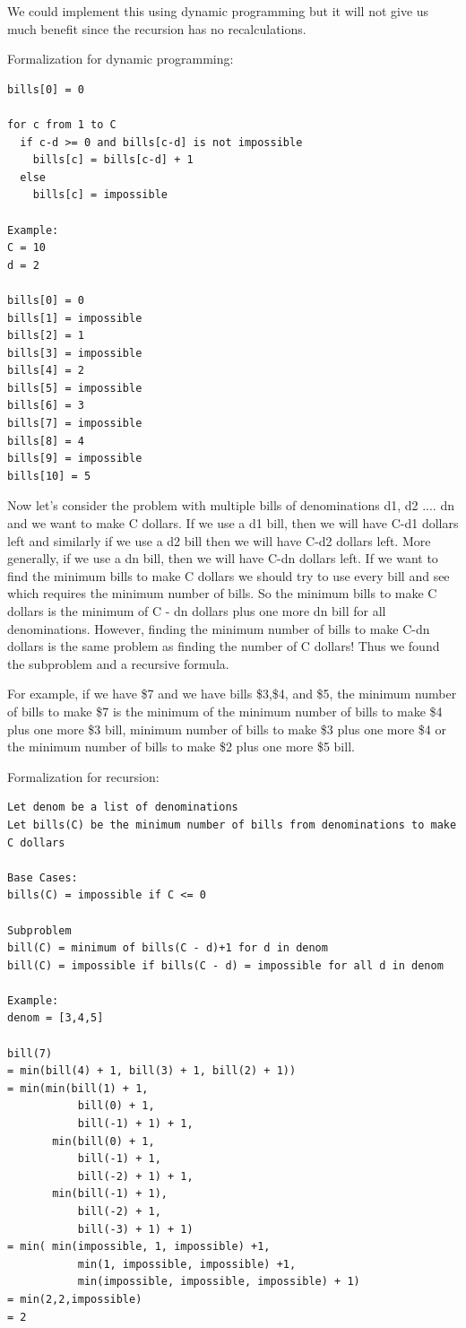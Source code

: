 \documentclass[11pt,oneside]{book}
\begin{document}
We could implement this using dynamic programming but it will not give us much benefit since the recursion has no recalculations.

Formalization for dynamic programming:

\begin{lstlisting}
bills[0] = 0

for c from 1 to C
  if c-d >= 0 and bills[c-d] is not impossible
    bills[c] = bills[c-d] + 1
  else
    bills[c] = impossible

Example:
C = 10
d = 2

bills[0] = 0
bills[1] = impossible
bills[2] = 1
bills[3] = impossible
bills[4] = 2
bills[5] = impossible
bills[6] = 3
bills[7] = impossible
bills[8] = 4
bills[9] = impossible
bills[10] = 5
\end{lstlisting}

Now let's consider the problem with multiple bills of denominations d1, d2 .... dn and we want to make C dollars. If we use a d1 bill, then we will have C-d1 dollars left and similarly if we use a d2 bill then we will have C-d2 dollars left. More generally, if we use a dn bill, then we will have C-dn dollars left. If we want to find the minimum bills to make C dollars we should try to use every bill and see which requires the minimum number of bills. So the minimum bills to make C dollars is the minimum of C - dn dollars plus one more dn bill for all denominations. However, finding the minimum number of bills to make C-dn dollars is the same problem as finding the number of C dollars! Thus we found the subproblem and a recursive formula.

For example, if we have \$7 and we have bills \$3,\$4, and \$5, the minimum number of bills to make \$7 is the minimum of the minimum number of bills to make \$4 plus one more \$3 bill, minimum number of bills to make \$3 plus one more \$4 or the minimum number of bills to make \$2 plus one more \$5 bill.

Formalization for recursion:

\begin{lstlisting}
Let denom be a list of denominations
Let bills(C) be the minimum number of bills from denominations to make C dollars

Base Cases:
bills(C) = impossible if C <= 0

Subproblem
bill(C) = minimum of bills(C - d)+1 for d in denom
bill(C) = impossible if bills(C - d) = impossible for all d in denom

Example:
denom = [3,4,5]

bill(7)
= min(bill(4) + 1, bill(3) + 1, bill(2) + 1))
= min(min(bill(1) + 1,
           bill(0) + 1,
           bill(-1) + 1) + 1, 
       min(bill(0) + 1,
           bill(-1) + 1,
           bill(-2) + 1) + 1, 
       min(bill(-1) + 1),
           bill(-2) + 1,
           bill(-3) + 1) + 1)
= min( min(impossible, 1, impossible) +1,
           min(1, impossible, impossible) +1,
           min(impossible, impossible, impossible) + 1)
= min(2,2,impossible)
= 2
\end{lstlisting}
\end{document}
